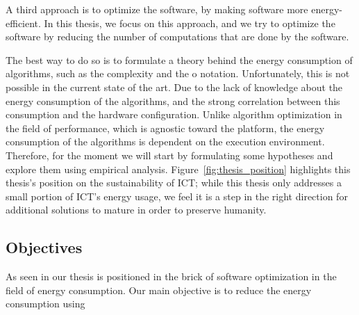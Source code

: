A third approach is to optimize the software, by making software more energy-efficient. In this thesis, we focus on this approach, and we try to optimize the software by reducing the number of computations that are done by the software. 

The best way to do so is to formulate a theory behind the energy consumption of algorithms, such as the complexity and the o notation.
Unfortunately, this is not possible in the current state of the art. Due to the lack of knowledge about the energy consumption of the algorithms, and the strong correlation between this consumption and the hardware configuration.
Unlike algorithm optimization in the field of performance, which is agnostic toward the platform, the energy consumption of the algorithms is dependent on the execution environment.
Therefore, for the moment we will start by formulating some hypotheses and explore them using empirical analysis.
Figure~\ref{fig:thesis_position} highlights this thesis's position on the sustainability of ICT; while this thesis only addresses a small portion of ICT's energy usage, we feel it is a step in the right direction for additional solutions to mature in order to preserve humanity.

\subsection*{Objectives}
As seen in  our thesis is positioned in the brick of software optimization in the field of energy consumption. 
Our main objective is to reduce the energy consumption using 

